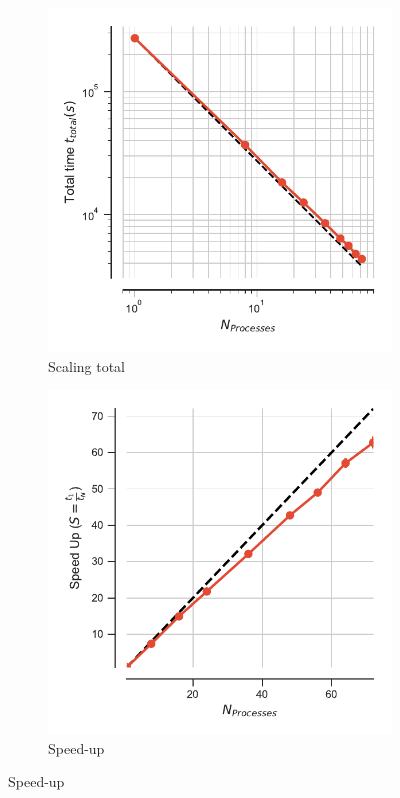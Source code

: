 \begin{figure}[ht!]
\centering
\begin{subfigure}{.4\textwidth}
  \includegraphics[width=\linewidth]{figures/main-dihedral-t_total.pdf}
  \caption{Scaling total}
  \label{fig:MPIscaling-dihed}
\end{subfigure}
\hfill
\begin{subfigure}{.4\textwidth}
  \includegraphics[width=\linewidth]{figures/main-dihedral-speed_up.pdf}
  \caption{Speed-up}
  \label{fig:MPIspeedup-dihed}
\end{subfigure}
\bigskip


\end{figure}
